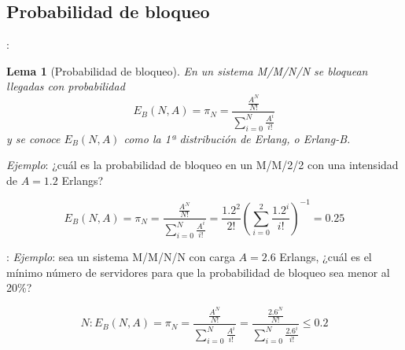 \documentclass[xcolor={x11names}]{beamer}
\newtheorem{lema}{Lema}[section]
\begin{document}
\subsection{Probabilidad de bloqueo}
\begin{frame}{\secname: \subsecname}
    \begin{lema}[Probabilidad de bloqueo]
        En un sistema M/M/N/N se bloquean
        llegadas con probabilidad
        \begin{equation}
            E_B(N,A)=\pi_N=
            \frac{\frac{A^N}{N!}}{\sum_{i=0}^N\frac{A^i}{i!}}
        \end{equation}
        y se conoce $E_B(N,A)$
        como la 1ª distribución
        de Erlang, o Erlang-B.
    \end{lema}

    \vfill

    \textit{Ejemplo}: ¿cuál es la probabilidad
    de bloqueo en un M/M/2/2 con una
    intensidad de $A=1.2$ Erlangs?
    \begin{figure}
        \resizebox{!}{.1\textwidth}{%
            
        }
    \end{figure}
    \begin{equation*}
        E_B(N,A)=\pi_N=
        \frac{\frac{A^N}{N!}}{\sum_{i=0}^N\frac{A^i}{i!}}
        =\frac{1.2^2}{2!}\left(
            \sum_{i=0}^2 \frac{1.2^i}{i!}
        \right)^{-1}
        = 0.25
    \end{equation*}
\end{frame}




\begin{frame}{\secname: \subsecname}
    \textit{Ejemplo}: sea un sistema
    M/M/N/N con carga $A=2.6$ Erlangs,
    ¿cuál es el mínimo
    número de servidores para que
    la probabilidad de bloqueo sea
    menor al 20\%?

    \begin{equation*}
        N: E_B(N,A)=\pi_N
        =\frac{\frac{A^N}{N!}}{\sum_{i=0}^N\frac{A^i}{i!}}
        =\frac{\frac{2.6^N}{N!}}{\sum_{i=0}^N\frac{2.6^i}{i!}}\leq 0.2
    \end{equation*}

    \begin{figure}
        
    \end{figure}
\end{frame}
\end{document}
